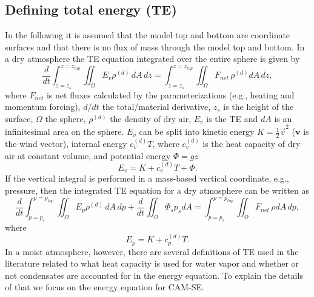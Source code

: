 \documentclass{agujournal}
\begin{document}
\subsection{Defining total energy (TE)}\label{sec:defE}
In the following it is assumed that the model top and bottom are coordinate surfaces and that there is no flux of mass through the model top and bottom. In a dry atmosphere the TE equation integrated over the entire sphere is given by
\begin{equation}
\frac{d}{dt}\int_{z=z_s}^{z=z_{top}}\iint_{\Omega} E_v \rho^{(d)}\, dA\, dz=\int_{z=z_s}^{z=z_{top}}\iint_{\Omega} F_{net}\, \rho^{(d)} dA\, dz,
\end{equation}
\citep[e.g., ][]{K1974MWR} where $F_{net}$ is net fluxes calculated by the parameterizations (e.g., heating and momentum forcing), $d/dt$ the total/material derivative, $z_s$ is the height of the surface, $\Omega$ the sphere, $\rho^{(d)}$ the density of dry air, $E_v$ is the TE and $dA$ is an infinitesimal area on the sphere. $E_v$ can be split into kinetic energy $K=\frac{1}{2}\vec{v}^2$ ($\mathbf{v}$ is the wind vector), internal energy $c_v^{(d)}T$, where $c_v^{(d)}$ is the heat capacity of dry air at constant volume, and potential energy $\Phi=gz$
\begin{equation}
E_v=K+c_v^{(d)}T+\Phi.
\end{equation}
If the vertical integral is performed in a mass-based vertical coordinate, e.g., pressure, then the integrated TE equation for a dry atmosphere can be written as
\begin{equation}
\frac{d}{dt}\int_{p=p_s}^{p=p_{top}}\iint_{\Omega} E_p \rho^{(d)}\, dA\, dp + \frac{d}{dt}\iint_{\Omega}\Phi_sp_s dA =\int_{p=p_s}^{p=p_{top}}\iint_{\Omega} F_{net}\, \rho dA\, dp,
\end{equation}
\citep[e.g., ][]{K1974MWR} where
\begin{equation}
E_p=K+c_p^{(d)}T.
\end{equation}
In a moist atmosphere, however, there are several definitions of TE used in the literature related to what heat capacity is used for water vapor and whether or not condensates are accounted for in the energy equation. To explain the details of that we focus on the energy equation for CAM-SE.
\end{document}
